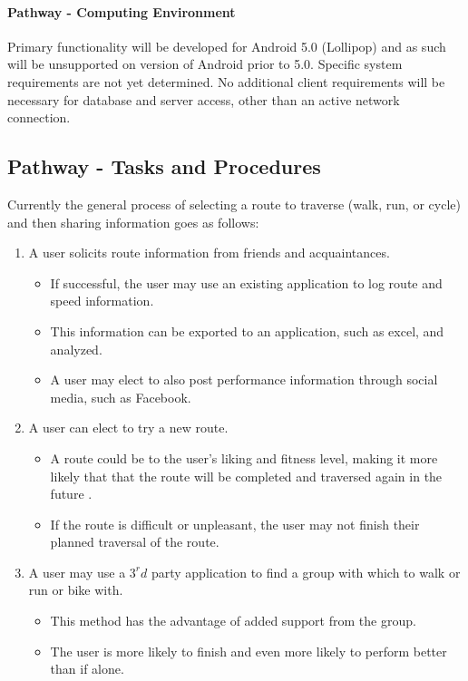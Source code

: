 ﻿\documentclass{article}
\begin{document}
\paragraph{Pathway - Computing Environment}
Primary functionality will be developed for Android 5.0 (Lollipop) and as such will be unsupported on version of Android prior to 5.0. Specific system requirements are not yet determined. No additional client requirements will be necessary for database and server access, other than an active network connection.

\subsection{Pathway - Tasks and Procedures}
Currently the general process of selecting a route to traverse (walk, run, or cycle) and then sharing information goes as follows:
\begin{enumerate}
    \item A user solicits route information from friends and acquaintances.
        \begin{itemize}
            \item If successful, the user may use an existing application to log route and speed information.
            \item This information can be exported to an application, such as excel, and analyzed.
            \item A user may elect to also post performance information through social media, such as Facebook.
        \end{itemize}
    \item A user can elect to try a new route.
        \begin{itemize}
            \item A route could be to the user's liking and fitness level, making it more likely that that the route will be completed and traversed again in the future .
            \item If the route is difficult or unpleasant, the user may not finish their planned traversal of the route.
        \end{itemize}
    \item A user may use a $3^rd$ party application to find a group with which to walk or run or bike with.
        \begin{itemize}
            \item This method has the advantage of added support from the group.
            \item The user is more likely to finish and even more likely to perform better than if alone.
        \end{itemize}
\end{enumerate}
\end{document}
